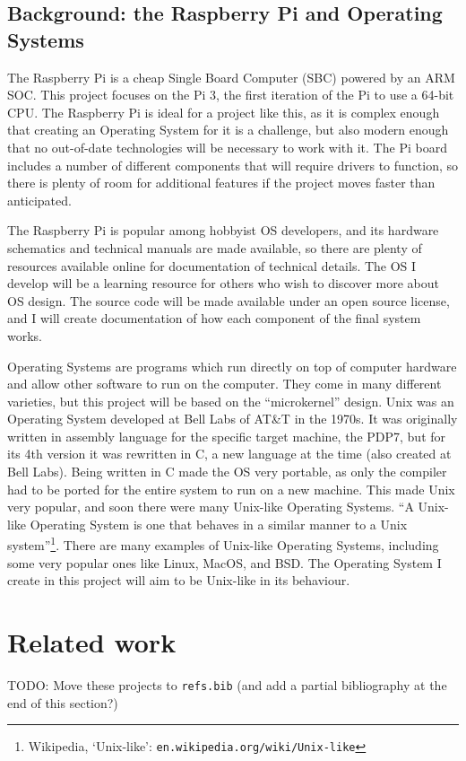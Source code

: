 \documentclass{article}
\begin{document}
\subsection*{Background: the Raspberry Pi and Operating Systems}
The Raspberry Pi is a cheap Single Board Computer (SBC) powered by an ARM SOC.
This project focuses on the Pi 3, the first iteration of the Pi to use a 64-bit
CPU. The Raspberry Pi is ideal for a project like this, as it is complex enough
that creating an Operating System for it is a challenge, but also modern enough
that no out-of-date technologies will be necessary to work with it. The Pi
board includes a number of different components that will require drivers to
function, so there is plenty of room for additional features if the project
moves faster than anticipated.

The Raspberry Pi is popular among hobbyist OS developers, and its hardware
schematics and technical manuals are made available, so there are plenty of
resources available online for documentation of technical details. The OS I
develop will be a learning resource for others who wish to discover more about
OS design. The source code will be made available under an open source license,
and I will create documentation of how each component of the final system
works.

Operating Systems are programs which run directly on top of computer hardware
and allow other software to run on the computer. They come in many different
varieties, but this project will be based on the ``microkernel'' design. Unix
was an Operating System developed at Bell Labs of AT\&T in the 1970s. It was
originally written in assembly language for the specific target machine, the
PDP7, but for its 4th version it was rewritten in C, a new language at the time
(also created at Bell Labs). Being written in C made the OS very portable, as
only the compiler had to be ported for the entire system to run on a new
machine. This made Unix very popular, and soon there were many Unix-like
Operating Systems. ``A Unix-like Operating System is one that behaves in a
similar manner to a Unix system''\footnote{Wikipedia, `Unix-like':
\texttt{en.wikipedia.org/wiki/Unix-like}}. There are many examples of Unix-like
Operating Systems, including some very popular ones like Linux, MacOS, and BSD.
The Operating System I create in this project will aim to be Unix-like in its
behaviour.


\section{Related work}
TODO: Move these projects to \texttt{refs.bib} (and add a partial bibliography
at the end of this section?)
\end{document}
